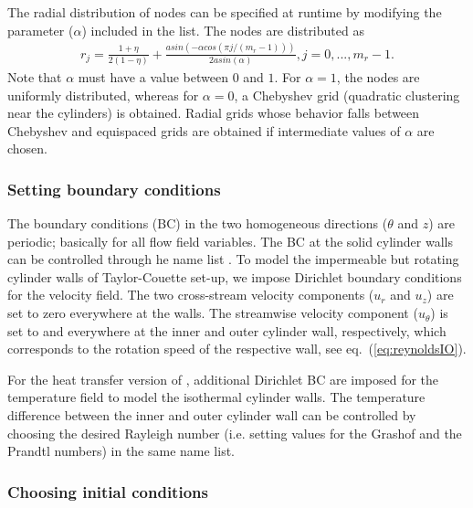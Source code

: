 \documentclass[a4paper, 11pt, DIV=11]{scrartcl}
\begin{document}
The radial distribution of nodes can be specified at runtime by modifying
the  parameter ($\alpha$) included in the
 list. The nodes are distributed as
\begin{align*}
  r_j = \frac{1+\eta}{2(1-\eta)} + \frac{asin(-\alpha cos(\pi j/(m_r-1)))}{2 asin(\alpha)},  j=0,...,m_r-1.
\end{align*}
Note that $\alpha$ must have a value between $0$ and $1$. For $\alpha = 1$, the nodes are uniformly
distributed, whereas for $\alpha = 0$, a Chebyshev grid (quadratic clustering near the cylinders)
is obtained. Radial grids whose behavior falls between Chebyshev and equispaced grids are
obtained if intermediate values of $\alpha$ are chosen. 

\subsubsection{Setting boundary conditions}
\label{sec:boundaryConditions}

The boundary conditions (BC) in the two homogeneous directions ($\theta$ and $z$) are
periodic; basically for all flow field variables. The BC at the solid cylinder walls can be
controlled through he name list . To model the impermeable
but rotating cylinder walls of Taylor-Couette set-up, we impose Dirichlet boundary
conditions for the velocity field. The two cross-stream velocity components ($u_r$ and
$u_z$) are set to zero everywhere at the walls. The streamwise velocity component
($u_{\theta}$) is set to \Rei and \Reo everywhere at the inner and outer cylinder wall,
respectively, which corresponds to the rotation speed of the respective wall, see
eq.~(\ref{eq:reynoldsIO}).
\par
For the heat transfer version of \nsc, additional Dirichlet BC are imposed for the
temperature field to model the isothermal cylinder walls. The temperature difference
between the inner and outer cylinder wall can be controlled by choosing the desired
Rayleigh number (i.e. setting values for the Grashof and the Prandtl numbers) in the
same name list.

\subsubsection{Choosing initial conditions}
\label{sec:initialConditions}
\end{document}
